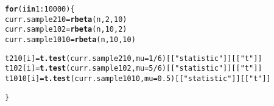 \documentclass{article}\usepackage[]{graphicx}\usepackage[]{xcolor}
\makeatletter
\newcommand{\hlnum}[1]{\textcolor[rgb]{0.686,0.059,0.569}{#1}}%
\newcommand{\hlsng}[1]{\textcolor[rgb]{0.192,0.494,0.8}{#1}}%
\newcommand{\hlopt}[1]{\textcolor[rgb]{0,0,0}{#1}}%
\newcommand{\hldef}[1]{\textcolor[rgb]{0.345,0.345,0.345}{#1}}%
\newcommand{\hlkwa}[1]{\textcolor[rgb]{0.161,0.373,0.58}{\textbf{#1}}}%
\newcommand{\hlkwb}[1]{\textcolor[rgb]{0.69,0.353,0.396}{#1}}%
\newcommand{\hlkwc}[1]{\textcolor[rgb]{0.333,0.667,0.333}{#1}}%
\newcommand{\hlkwd}[1]{\textcolor[rgb]{0.737,0.353,0.396}{\textbf{#1}}}%
\newenvironment{kframe}{%
 \def\at@end@of@kframe{}%
 \ifinner\ifhmode%
  \def\at@end@of@kframe{\end{minipage}}%
  \begin{minipage}{\columnwidth}%
 \fi\fi%
 \def\FrameCommand##1{\hskip\@totalleftmargin \hskip-\fboxsep
 \colorbox{shadecolor}{##1}\hskip-\fboxsep
     \hskip-\linewidth \hskip-\@totalleftmargin \hskip\columnwidth}%
 \MakeFramed {\advance\hsize-\width
   \@totalleftmargin\z@ \linewidth\hsize
   \@setminipage}}%
 {\par\unskip\endMakeFramed%
 \at@end@of@kframe}
\newenvironment{knitrout}{}{} %
\makeatother
\begin{document}
\begin{enumerate}
\begin{enumerate}
\begin{knitrout}
\begin{kframe}
\begin{alltt}
\hlkwa{for}\hldef{(i} \hlkwa{in} \hlnum{1}\hlopt{:}\hlnum{10000}\hldef{)\{}
  \hldef{curr.sample210} \hlkwb{=} \hlkwd{rbeta}\hldef{(n,}\hlnum{2}\hldef{,}\hlnum{10}\hldef{)}
  \hldef{curr.sample102} \hlkwb{=} \hlkwd{rbeta}\hldef{(n,}\hlnum{10}\hldef{,}\hlnum{2}\hldef{)}
  \hldef{curr.sample1010} \hlkwb{=} \hlkwd{rbeta}\hldef{(n,}\hlnum{10}\hldef{,}\hlnum{10}\hldef{)}

  \hldef{t210[i]} \hlkwb{=} \hlkwd{t.test}\hldef{(curr.sample210,} \hlkwc{mu} \hldef{=} \hlnum{1}\hlopt{/}\hlnum{6}\hldef{)[[}\hlsng{"statistic"}\hldef{]][[}\hlsng{"t"}\hldef{]]}
  \hldef{t102[i]} \hlkwb{=} \hlkwd{t.test}\hldef{(curr.sample102,} \hlkwc{mu} \hldef{=} \hlnum{5}\hlopt{/}\hlnum{6}\hldef{)[[}\hlsng{"statistic"}\hldef{]][[}\hlsng{"t"}\hldef{]]}
  \hldef{t1010[i]} \hlkwb{=} \hlkwd{t.test}\hldef{(curr.sample1010,} \hlkwc{mu} \hldef{=} \hlnum{0.5}\hldef{)[[}\hlsng{"statistic"}\hldef{]][[}\hlsng{"t"}\hldef{]]}

\hldef{\}}



\end{alltt}
\end{kframe}
\end{knitrout}
\end{enumerate}
\end{enumerate}
\end{document}
